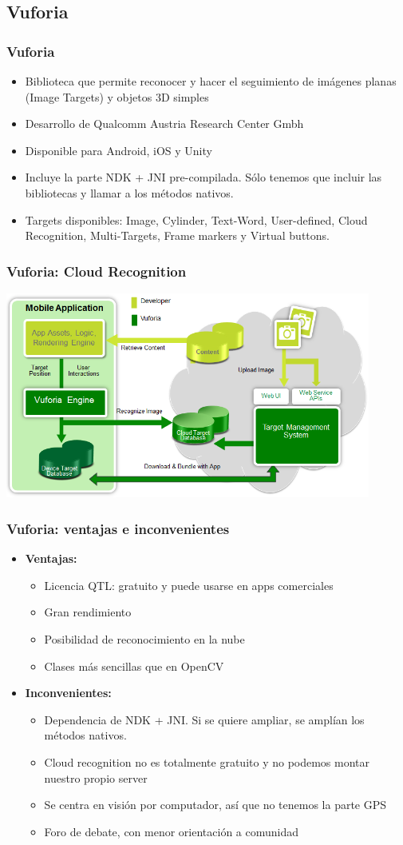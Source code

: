 \subsection*{Vuforia}
\frame
{
\frametitle{Vuforia}
\begin{itemize}
 \item Biblioteca que permite reconocer y hacer el seguimiento de imágenes planas (Image Targets) y objetos 3D simples
 \item Desarrollo de Qualcomm Austria Research Center Gmbh
 \item Disponible para Android, iOS y Unity
 \item Incluye la parte NDK + JNI pre-compilada. Sólo tenemos que incluir las bibliotecas y llamar a los métodos nativos.
 \item Targets disponibles: Image, Cylinder, Text-Word, User-defined, Cloud Recognition, Multi-Targets, Frame markers y Virtual buttons.
\end{itemize}
}

\frame
{
\frametitle{Vuforia: Cloud Recognition}
 \includegraphics[width=12cm]{imgs/vuforia-components.png}
}

\frame
{
\frametitle{Vuforia: ventajas e inconvenientes}
\begin{itemize}
\item \textbf{Ventajas:}
  \begin{itemize}
   \item Licencia QTL: gratuito y puede usarse en apps comerciales
   \item Gran rendimiento
   \item Posibilidad de reconocimiento en la nube
   \item Clases más sencillas que en OpenCV
  \end{itemize}

\item \textbf{Inconvenientes:}
  \begin{itemize}
   \item Dependencia de NDK + JNI. Si se quiere ampliar, se amplían los métodos nativos.
   \item Cloud recognition no es totalmente gratuito y no podemos montar nuestro propio server
   \item Se centra en visión por computador, así que no tenemos la parte GPS
   \item Foro de debate, con menor orientación a comunidad
  \end{itemize}

\end{itemize}
}

